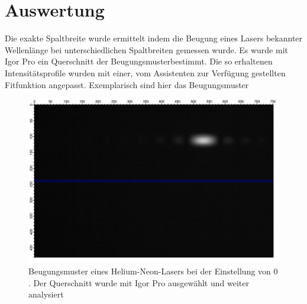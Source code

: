 %
%
\section {Auswertung}
Die exakte Spaltbreite wurde ermittelt indem die Beugung eines Lasers bekannter Wellenlänge bei unterschiedlichen Spaltbreiten gemessen wurde. Es wurde mit Igor Pro ein Querschnitt der Beugungsmusterbestimmt. Die so erhaltenen Intensitätsprofile wurden mit einer, vom Assistenten zur Verfügung gestellten Fitfunktion angepasst. Exemplarisch sind hier das Beugungsmuster %

\begin{figure}[H]
	\centering	
	\begin{minipage}{1\textwidth}
		\includegraphics[width=\columnwidth]{180618/Graph0.png}
	\end{minipage}
	\caption{Beugungsmuster eines Helium-Neon-Lasers bei der Einstellung von $0$. Der Querschnitt wurde mit Igor Pro ausgewählt und weiter analysiert }
	\label{HeNe_0}
\end{figure}

